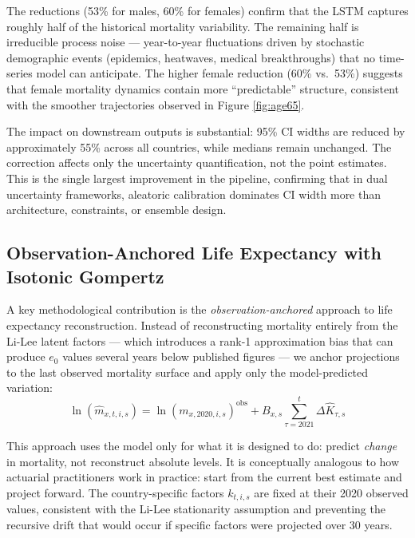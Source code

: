 \documentclass[11pt,a4paper]{article}
\begin{document}
The reductions (53\% for males, 60\% for females) confirm that the LSTM captures roughly half of the historical mortality variability. The remaining half is irreducible process noise --- year-to-year fluctuations driven by stochastic demographic events (epidemics, heatwaves, medical breakthroughs) that no time-series model can anticipate. The higher female reduction (60\% vs.\ 53\%) suggests that female mortality dynamics contain more ``predictable'' structure, consistent with the smoother trajectories observed in Figure \ref{fig:age65}.

The impact on downstream outputs is substantial: 95\% CI widths are reduced by approximately 55\% across all countries, while medians remain unchanged. The correction affects only the uncertainty quantification, not the point estimates. This is the single largest improvement in the pipeline, confirming that in dual uncertainty frameworks, aleatoric calibration dominates CI width more than architecture, constraints, or ensemble design.

\subsection{Observation-Anchored Life Expectancy with Isotonic Gompertz}\label{sec:observation_anchored}

A key methodological contribution is the \textit{observation-anchored} approach to life expectancy reconstruction. Instead of reconstructing mortality entirely from the Li-Lee latent factors --- which introduces a rank-1 approximation bias that can produce $e_0$ values several years below published figures --- we anchor projections to the last observed mortality surface and apply only the model-predicted variation:
\begin{equation}\label{eq:anchored}
    \ln(\hat{m}_{x,t,i,s}) = \ln(m_{x,2020,i,s})^{\text{obs}} + B_{x,s} \sum_{\tau=2021}^{t} \Delta \hat{K}_{\tau,s}
\end{equation}

This approach uses the model only for what it is designed to do: predict \textit{change} in mortality, not reconstruct absolute levels. It is conceptually analogous to how actuarial practitioners work in practice: start from the current best estimate and project forward. The country-specific factors $k_{t,i,s}$ are fixed at their 2020 observed values, consistent with the Li-Lee stationarity assumption and preventing the recursive drift that would occur if specific factors were projected over 30 years.
\end{document}
